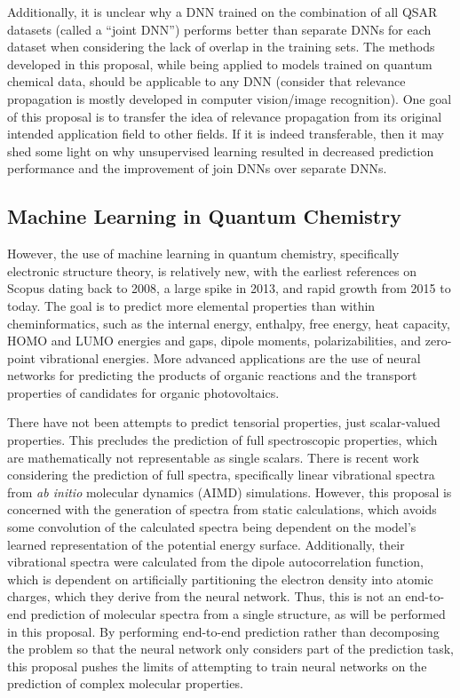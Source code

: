 \documentclass[12pt]{article}
\begin{document}
Additionally, it is unclear why a DNN trained on the combination of all QSAR datasets (called a ``joint DNN'') performs better than separate DNNs for each dataset when considering the lack of overlap in the training sets. The methods developed in this proposal, while being applied to models trained on quantum chemical data, should be applicable to any DNN (consider that relevance propagation is mostly developed in computer vision/image recognition). One goal of this proposal is to transfer the idea of relevance propagation from its original intended application field to other fields. If it is indeed transferable, then it may shed some light on why unsupervised learning resulted in decreased prediction performance and the improvement of join DNNs over separate DNNs.

\subsection{Machine Learning in Quantum Chemistry}
\label{sec:org36cda66}

However, the use of machine learning in quantum chemistry, specifically electronic structure theory, is relatively new, with the earliest references on Scopus dating back to 2008, a large spike in 2013, and rapid growth from 2015 to today. The goal is to predict more elemental properties than within cheminformatics, such as the internal energy, enthalpy, free energy, heat capacity, HOMO and LUMO energies and gaps, dipole moments, polarizabilities, and zero-point vibrational energies\cite{2015arXiv150204563R}. More advanced applications are the use of neural networks for predicting the products of organic reactions\cite{doi:10.1021/acscentsci.6b00219} and the transport properties of candidates for organic photovoltaics\cite{C5SC04786B}.

There have not been attempts to predict tensorial properties, just scalar-valued properties. This precludes the prediction of full spectroscopic properties, which are mathematically not representable as single scalars. There is recent work considering the prediction of full spectra, specifically linear vibrational spectra from \emph{ab initio} molecular dynamics (AIMD) simulations\cite{2017arXiv170505907G}. However, this proposal is concerned with the generation of spectra from static calculations, which avoids some convolution of the calculated spectra being dependent on the model's learned representation of the potential energy surface. Additionally, their vibrational spectra were calculated from the dipole autocorrelation function, which is dependent on artificially partitioning the electron density into atomic charges, which they derive from the neural network. Thus, this is not an end-to-end \cite{2016arXiv160407316B} prediction of molecular spectra from a single structure, as will be performed in this proposal. By performing end-to-end prediction rather than decomposing the problem so that the neural network only considers part of the prediction task, this proposal pushes the limits of attempting to train neural networks on the prediction of complex molecular properties.
\end{document}
